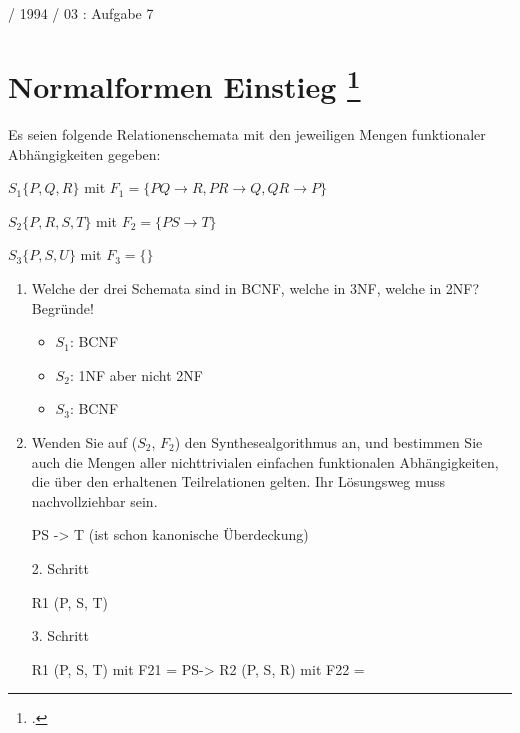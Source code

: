 \documentclass{lehramt-informatik}
\begin{document}
 / 1994 / 03 : Aufgabe 7

%

\section{Normalformen Einstieg
\footcite[Seite 1, Aufgabe 1: Normalformen Einstieg]{db:pu:4}
}

Es seien folgende Relationenschemata mit den jeweiligen Mengen
funktionaler Abhängigkeiten gegeben:

$S_1 \{P, Q, R\}$ mit
$F_1 = \{P Q \rightarrow R, P R \rightarrow Q, QR \rightarrow P \}$

$S_2 \{P, R, S, T \}$ mit
$F_2 = \{P S \rightarrow T \}$

$S_3 \{P, S, U \}$ mit
$F_3 = \{\}$

\begin{enumerate}


\item Welche der drei Schemata sind in BCNF, welche in 3NF, welche in
2NF? Begründe!

\begin{antwort}
\begin{itemize}
\item $S_1$: BCNF

\item $S_2$: 1NF aber nicht 2NF

\item $S_3$: BCNF
\end{itemize}
\end{antwort}


\item Wenden Sie auf ($S_2$, $F_2$) den Synthesealgorithmus an, und
bestimmen Sie auch die Mengen aller nichttrivialen einfachen
funktionalen Abhängigkeiten, die über den erhaltenen Teilrelationen
gelten. Ihr Lösungsweg muss nachvollziehbar sein.

\begin{antwort}
PS -> T (ist schon kanonische Überdeckung)

2. Schritt

R1 (P, S, T)

3. Schritt

R1 (P, S, T) mit F21 = {PS->}
R2 (P, S, R) mit F22 = {}

\end{antwort}

\end{enumerate}
\end{document}
